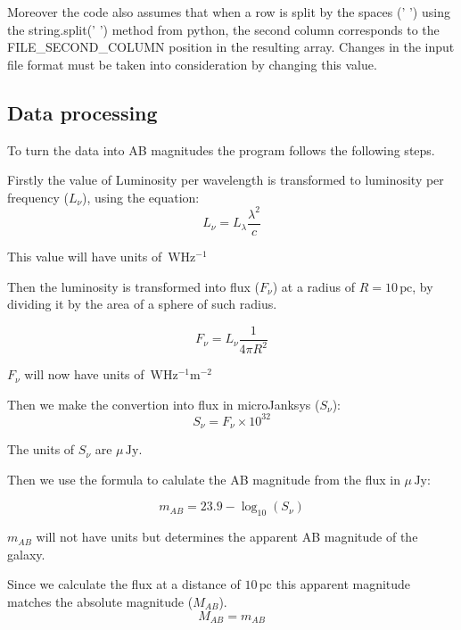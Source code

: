 \documentclass[11pt]{article}
\newcommand{\unit}[1]{\ensuremath{\, \mathrm{#1}}}
\begin{document}
Moreover the code also assumes that when a row is split by the spaces (' ') using the string.split(' ') method from python, the second column corresponds to the FILE\_SECOND\_COLUMN position in the resulting array. Changes in the input file format must be taken into consideration by changing this value.

\subsection{Data processing}

To turn the data into AB magnitudes the program follows the following steps.

Firstly the value of Luminosity per wavelength is transformed to luminosity per frequency ($L_\nu$), using the equation:
\begin{equation}
L_\nu = L_\lambda \frac{\lambda^2}{c}
\end{equation}

This value will have units of $\unit{W Hz^{-1}}$

Then the luminosity is transformed into flux ($F_\nu$) at a radius of $R = 10 \unit{pc}$, by dividing it by the area of a sphere of such radius.

\begin{equation}
F_\nu = L_\nu \frac{1}{4\pi R^2}
\end{equation}

$F_\nu$ will now have units of $\unit{W Hz^{-1}m^{-2}}$

Then we make the convertion into flux in microJanksys ($S_\nu$):
\begin{equation}
S_\nu = F_\nu \times 10^{32}
\end{equation}

The units of $S_\nu$ are $\mu\unit{Jy}$.

Then we use the formula to calulate the AB magnitude from the flux in $\mu \unit{Jy}$:

\begin{equation}
m_{AB} = 23.9 - \log_{10}\left( S_\nu \right)
\end{equation}

$m_{AB}$ will not have units but determines the apparent AB magnitude of the galaxy.

Since we calculate the flux at a distance of $10 \unit{pc}$ this apparent magnitude matches the absolute magnitude ($M_{AB}$).
\begin{equation}
M_{AB} = m_{AB}
\end{equation}
\end{document}
